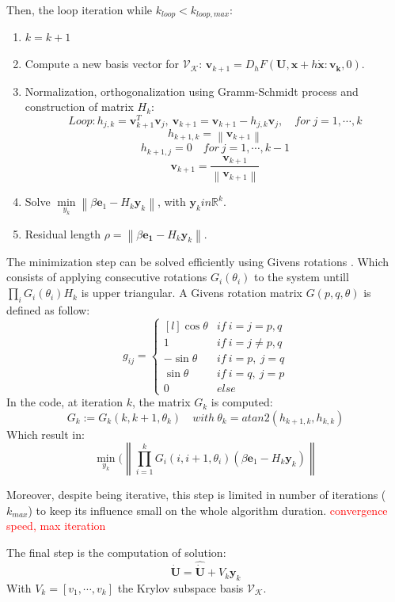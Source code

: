 \documentclass[a4paper, 12pt]{report}
\newcommand\norm[1]{\left\lVert#1\right\rVert}
\begin{document}
Then, the loop iteration while $k_{loop} < k_{loop,max}$:
\begin{enumerate}
\item $k = k+1$
\item Compute a new basis vector for $\mathcal{V}_\mathcal{K}$: $\boldsymbol{v}_{k+1} =  D_h F(\boldsymbol{U}, \boldsymbol{x}+ h\boldsymbol{\dot x} : \boldsymbol{v_k}, 0)$.
\item Normalization, orthogonalization using Gramm-Schmidt process and construction of matrix $H_k$:
\[ Loop: h_{j,k} = \boldsymbol{v}_{k+1}^T \boldsymbol{v}_j,\ \boldsymbol{v}_{k+1} = \boldsymbol{v}_{k+1} - h_{j,k}\boldsymbol{v}_j, \quad for\ j = 1, \cdots, k \]
\[ h_{k+1,k} = \norm{\boldsymbol{v}_{k+1}} \]
\[ h_{k+1, j} =  0\quad for\ j = 1, \cdots, k-1 \]
\[ \boldsymbol{v}_{k+1} = \frac{\boldsymbol{v}_{k+1}}{\norm{\boldsymbol{v}_{k+1}}} \]
\item Solve $\min\limits_{y_k}\norm{\beta \boldsymbol{e}_1 - H_k\boldsymbol{y}_k}$, with $\boldsymbol{y}_k in \mathbb{R}^k$.
\item Residual length $\rho = \norm{\beta \boldsymbol{e_1} - H_k\boldsymbol{y}_k}$.
\end{enumerate}

The minimization step can be solved efficiently using Givens rotations \cite{Bjorck1996}. Which consists of applying consecutive rotations $G_i(\theta_i)$ to the system untill $\prod_i G_i(\theta_i) H_k$ is upper triangular.
A Givens rotation matrix $G(p, q, \theta)$ is defined  as follow:
\[ g_{ij} = \left\{ \begin{matrix*}[l] \cos{\theta} &  if\ i = j = p, q \\ 1 & if\ i = j \neq p, q  \\  -\sin{\theta} &  if\ i = p,\ j = q \\ \sin{\theta} &  if\ i = q,\ j = p \\ 0 & else \end{matrix*} \right.\]
In the code, at iteration $k$, the matrix $G_k$ is computed:
\[ G_k := G_k(k, k+1, \theta_k) \quad with\ \theta_k = atan2(h_{k+1, k}, h_{k,k})\]
Which result in:
\[ \min\limits_{y_k}(\norm{\prod\limits_{i=1}^k G_i(i, i+1, \theta_i) (\beta \boldsymbol{e}_1 - H_k \boldsymbol{y}_k)} \]

Moreover, despite being iterative, this step is limited in number of iterations ($k_{max}$) to keep its influence small on the whole algorithm duration. \textcolor{red}{convergence speed, max iteration}

The final step is the computation of solution:
\[ \boldsymbol{\dot U} = \boldsymbol{\hat{ \dot U}} + V_k \boldsymbol{y}_k \]
With $V_k = [v_1, \cdots, v_k]$ the Krylov subspace basis $\mathcal{V}_\mathcal{K}$.
\end{document}
